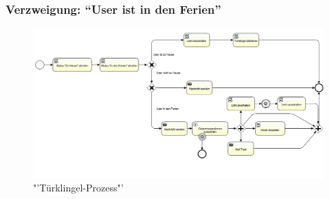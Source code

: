 \subsubsection{Verzweigung: "`User ist in den Ferien"'}

\newpage
\begin{landscape}
\begin{figure}[H]
  \centering
  \includegraphics[width=21cm]{./images/DoorBellProcess}
  \caption{"'Türklingel-Prozess"'}\label{img:AnalyseRpi:DoorbellProcess}
\end{figure}
\end{landscape}
